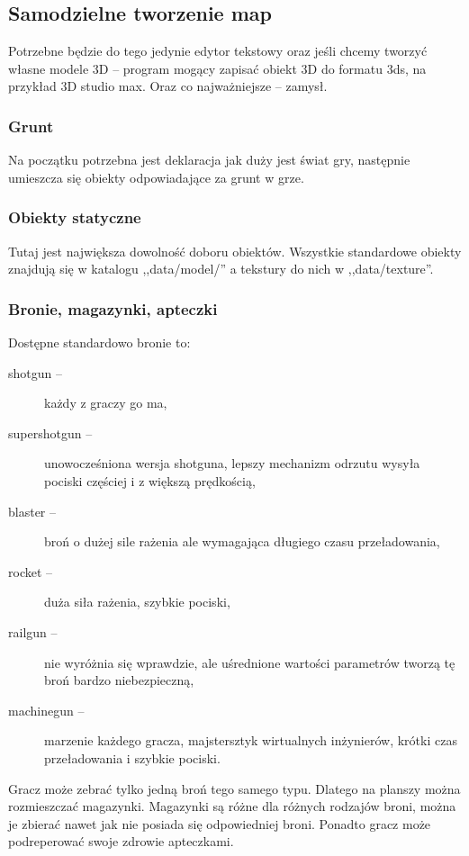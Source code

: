 \documentclass[licencjacka]{pracamgr}
\begin{document}
\subsection{Samodzielne tworzenie map}

Potrzebne będzie do tego jedynie edytor tekstowy oraz jeśli chcemy tworzyć własne modele 3D -- program mogący zapisać
obiekt 3D do formatu 3ds, na przykład 3D studio max. Oraz co najważniejsze -- zamysł.

\subsubsection{Grunt}

Na początku potrzebna jest deklaracja jak duży jest świat gry, następnie umieszcza się obiekty odpowiadające
za grunt w grze.

\subsubsection{Obiekty statyczne}

Tutaj jest największa dowolność doboru obiektów. Wszystkie standardowe obiekty znajdują się w katalogu ,,data/model/'' a
tekstury do nich w ,,data/texture''.

\subsubsection{Bronie, magazynki, apteczki}

Dostępne standardowo bronie to:
\begin{description}
\item[shotgun -- ] każdy z graczy go ma,
\item[supershotgun -- ] unowocześniona wersja shotguna, lepszy mechanizm odrzutu wysyła pociski częściej i z większą prędkością,
\item[blaster -- ] broń o dużej sile rażenia ale wymagająca długiego czasu przeładowania,
\item[rocket -- ] duża siła rażenia, szybkie pociski,
\item[railgun -- ] nie wyróżnia się wprawdzie, ale uśrednione wartości parametrów tworzą tę broń bardzo niebezpieczną,
\item[machinegun -- ] marzenie każdego gracza, majstersztyk wirtualnych inżynierów, krótki czas przeładowania i szybkie pociski.
\end{description}

Gracz może zebrać tylko jedną broń tego samego typu. Dlatego na planszy można rozmieszczać magazynki.
Magazynki są różne dla różnych rodzajów broni, można je zbierać nawet jak nie posiada się odpowiedniej broni.
Ponadto gracz może podreperować swoje zdrowie apteczkami.
\end{document}
